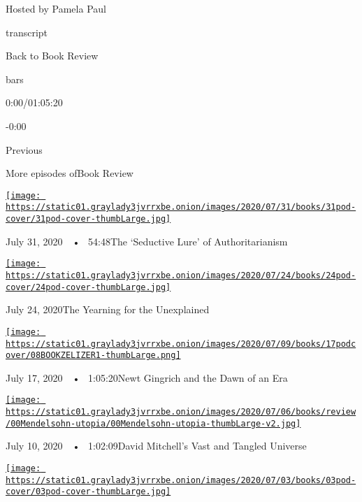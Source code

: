 Hosted by Pamela Paul

transcript

Back to Book Review

bars

0:00/01:05:20

-0:00

Previous

More episodes ofBook Review

\href{https://www.nytimes3xbfgragh.onion/2020/07/31/books/review/podcast-twilight-democracy-anne-applebaum-eat-buddha-barbara-demick.html?action=click\&module=audio-series-bar\&region=header\&pgtype=Article}{\texttt{[image: https://static01.graylady3jvrrxbe.onion/images/2020/07/31/books/31pod-cover/31pod-cover-thumbLarge.jpg]}}

July 31, 2020~~•~ 54:48The `Seductive Lure' of Authoritarianism

\href{https://www.nytimes3xbfgragh.onion/2020/07/24/books/review/podcast-colin-dickey-unexplained-miles-harvey-king-of-confidence.html?action=click\&module=audio-series-bar\&region=header\&pgtype=Article}{\texttt{[image: https://static01.graylady3jvrrxbe.onion/images/2020/07/24/books/24pod-cover/24pod-cover-thumbLarge.jpg]}}

July 24, 2020The Yearning for the Unexplained

\href{https://www.nytimes3xbfgragh.onion/2020/07/17/books/review/podcast-julian-zelizer-burning-down-house-newt-gingrich-notes-silencing-lacy-crawford.html?action=click\&module=audio-series-bar\&region=header\&pgtype=Article}{\texttt{[image: https://static01.graylady3jvrrxbe.onion/images/2020/07/09/books/17podcover/08BOOKZELIZER1-thumbLarge.png]}}

July 17, 2020~~•~ 1:05:20Newt Gingrich and the Dawn of an Era

\href{https://www.nytimes3xbfgragh.onion/2020/07/10/books/review/david-mitchell-utopia-avenue-daniel-mendelsohn-biggest-bluff-poker-maria-konnikova.html?action=click\&module=audio-series-bar\&region=header\&pgtype=Article}{\texttt{[image: https://static01.graylady3jvrrxbe.onion/images/2020/07/06/books/review/00Mendelsohn-utopia/00Mendelsohn-utopia-thumbLarge-v2.jpg]}}

July 10, 2020~~•~ 1:02:09David Mitchell's Vast and Tangled Universe

\href{https://www.nytimes3xbfgragh.onion/2020/07/03/books/review/podcast-jules-feiffer-smart-george-steve-inskeep-imperfect-union.html?action=click\&module=audio-series-bar\&region=header\&pgtype=Article}{\texttt{[image: https://static01.graylady3jvrrxbe.onion/images/2020/07/03/books/03pod-cover/03pod-cover-thumbLarge.jpg]}}

